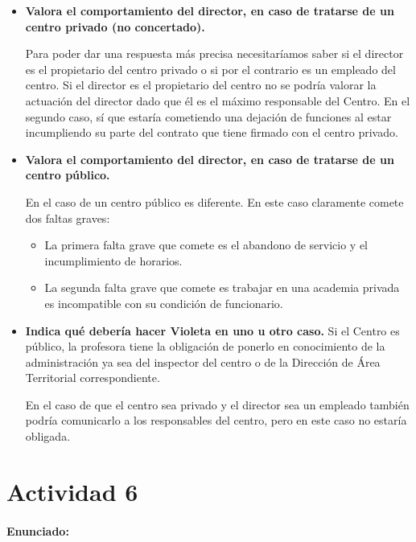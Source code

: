 \begin{itemize}
\item \textbf{Valora el comportamiento del director, en caso de tratarse de un centro privado (no concertado).
}

Para poder dar una respuesta más precisa necesitaríamos saber si el director es el propietario del centro privado o si por el contrario es un empleado del centro.
 Si el director es el propietario del centro no se podría valorar la actuación del director dado que él es el máximo responsable del Centro.
 En el segundo caso, sí que estaría cometiendo una dejación de funciones al estar incumpliendo su parte del contrato que tiene firmado con el centro privado.



\item \textbf{Valora el comportamiento del director, en caso de tratarse de un centro público.
}

En el caso de un centro público es diferente.
 En este caso claramente comete dos faltas graves:

\begin{itemize}
\item La primera falta grave que comete es el abandono de servicio y el incumplimiento de horarios.

\item La segunda falta grave que comete es trabajar en una academia privada es incompatible con su condición de funcionario.

\end{itemize}


\item \textbf{Indica qué debería hacer Violeta en uno u otro caso.
}
Si el Centro es público, la profesora tiene la obligación de ponerlo en conocimiento de la administración ya sea del inspector del centro o de la Dirección de Área Territorial correspondiente.

%
En el caso de que el centro sea privado y el director sea un empleado también podría comunicarlo a los responsables del centro, pero en este caso no estaría obligada.


\end{itemize}


\newpage
\section*{Actividad 6}
\paragraph{Enunciado: }

